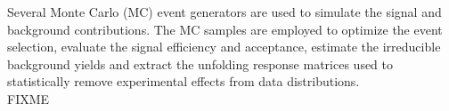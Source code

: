 Several Monte Carlo (MC) event generators are used to simulate the signal and background contributions. The MC samples are employed to optimize the event selection, evaluate the signal efficiency and acceptance, estimate the irreducible background yields and extract the unfolding response matrices used to statistically remove experimental effects from data distributions.\\
FIXME

